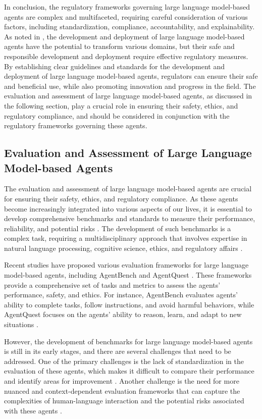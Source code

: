 \documentclass[11pt,a4paper]{article}
\begin{document}
In conclusion, the regulatory frameworks governing large language model-based agents are complex and multifaceted, requiring careful consideration of various factors, including standardization, compliance, accountability, and explainability. As noted in \cite{arxiv:2303.18223}, the development and deployment of large language model-based agents have the potential to transform various domains, but their safe and responsible development and deployment require effective regulatory measures. By establishing clear guidelines and standards for the development and deployment of large language model-based agents, regulators can ensure their safe and beneficial use, while also promoting innovation and progress in the field. The evaluation and assessment of large language model-based agents, as discussed in the following section, play a crucial role in ensuring their safety, ethics, and regulatory compliance, and should be considered in conjunction with the regulatory frameworks governing these agents.


\subsection{Evaluation and Assessment of Large Language Model-based Agents}


The evaluation and assessment of large language model-based agents are crucial for ensuring their safety, ethics, and regulatory compliance. As these agents become increasingly integrated into various aspects of our lives, it is essential to develop comprehensive benchmarks and standards to measure their performance, reliability, and potential risks \cite{arxiv:2308.03688}. The development of such benchmarks is a complex task, requiring a multidisciplinary approach that involves expertise in natural language processing, cognitive science, ethics, and regulatory affairs \cite{doi:10.1145/3748302}.

Recent studies have proposed various evaluation frameworks for large language model-based agents, including AgentBench \cite{arxiv:2308.03688} and AgentQuest \cite{arxiv:2404.06411}. These frameworks provide a comprehensive set of tasks and metrics to assess the agents' performance, safety, and ethics. For instance, AgentBench evaluates agents' ability to complete tasks, follow instructions, and avoid harmful behaviors, while AgentQuest focuses on the agents' ability to reason, learn, and adapt to new situations \cite{arxiv:2404.06411}.

However, the development of benchmarks for large language model-based agents is still in its early stages, and there are several challenges that need to be addressed. One of the primary challenges is the lack of standardization in the evaluation of these agents, which makes it difficult to compare their performance and identify areas for improvement \cite{doi:10.1145/3641289}. Another challenge is the need for more nuanced and context-dependent evaluation frameworks that can capture the complexities of human-language interaction and the potential risks associated with these agents \cite{arxiv:2404.09135}.
\end{document}
